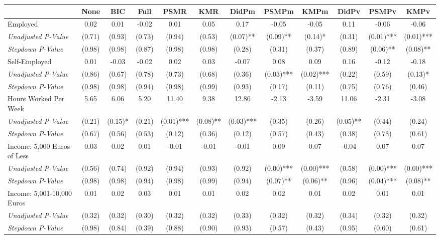 \begin{tabular}{l c c c c c c c c c c c}
\toprule
 & None & BIC & Full & PSMR & KMR & DidPm & PSMPm & KMPm & DidPv & PSMPv & KMPv \\
\midrule
Employed & 0.02 & 0.01 & -0.02 & 0.01 & 0.05 & 0.17 & -0.05 & -0.05 & 0.11 & -0.06 & -0.06 \\
\quad \textit{Unadjusted P-Value} & (0.71) & (0.93) & (0.73) & (0.94) & (0.53) & (0.07)** & (0.09)** & (0.14)* & (0.31) & (0.01)*** & (0.01)*** \\
\quad \textit{Stepdown P-Value} & (0.98) & (0.98) & (0.87) & (0.98) & (0.98) & (0.28) & (0.31) & (0.37) & (0.89) & (0.06)** & (0.08)** \\
Self-Employed & 0.01 & -0.03 & -0.02 & 0.02 & 0.03 & -0.07 & 0.08 & 0.09 & 0.16 & -0.12 & -0.18 \\
\quad \textit{Unadjusted P-Value} & (0.86) & (0.67) & (0.78) & (0.73) & (0.68) & (0.36) & (0.03)*** & (0.02)*** & (0.22) & (0.59) & (0.13)* \\
\quad \textit{Stepdown P-Value} & (0.98) & (0.98) & (0.94) & (0.98) & (0.99) & (0.93) & (0.17) & (0.11) & (0.75) & (0.76) & (0.46) \\
Hours Worked Per Week & 5.65 & 6.06 & 5.20 & 11.40 & 9.38 & 12.80 & -2.13 & -3.59 & 11.06 & -2.31 & -3.08 \\
\quad \textit{Unadjusted P-Value} & (0.21) & (0.15)* & (0.21) & (0.01)*** & (0.08)** & (0.03)*** & (0.35) & (0.26) & (0.05)** & (0.44) & (0.24) \\
\quad \textit{Stepdown P-Value} & (0.67) & (0.56) & (0.53) & (0.12) & (0.36) & (0.12) & (0.57) & (0.43) & (0.38) & (0.73) & (0.61) \\
Income: 5,000 Euros of Less & 0.03 & 0.02 & 0.01 & -0.01 & -0.01 & -0.01 & 0.09 & 0.07 & -0.04 & 0.07 & 0.07 \\
\quad \textit{Unadjusted P-Value} & (0.56) & (0.74) & (0.92) & (0.94) & (0.93) & (0.92) & (0.00)*** & (0.00)*** & (0.58) & (0.00)*** & (0.00)*** \\
\quad \textit{Stepdown P-Value} & (0.98) & (0.98) & (0.94) & (0.98) & (0.99) & (0.94) & (0.07)** & (0.06)** & (0.96) & (0.04)*** & (0.08)** \\
Income: 5,001-10,000 Euros & 0.01 & 0.02 & 0.03 & 0.01 & 0.01 & 0.02 & 0.02 & 0.01 & 0.02 & 0.01 & 0.01 \\
\quad \textit{Unadjusted P-Value} & (0.32) & (0.32) & (0.30) & (0.32) & (0.32) & (0.33) & (0.32) & (0.32) & (0.34) & (0.32) & (0.32) \\
\quad \textit{Stepdown P-Value} & (0.98) & (0.84) & (0.39) & (0.88) & (0.90) & (0.93) & (0.57) & (0.43) & (0.95) & (0.60) & (0.61) \\

\end{tabular}
